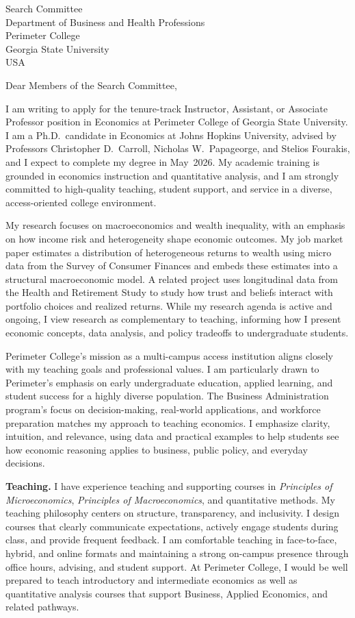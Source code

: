 \documentclass[11pt,letterpaper]{letter}
\begin{document}
\begin{letter}{Search Committee \\
Department of Business and Health Professions \\
Perimeter College \\
Georgia State University \\ USA}

\opening{Dear Members of the Search Committee,}

I am writing to apply for the tenure-track Instructor, Assistant, or Associate Professor position in Economics at Perimeter College of Georgia State University. I am a Ph.D.\ candidate in Economics at Johns Hopkins University, advised by Professors Christopher D.~Carroll, Nicholas W.~Papageorge, and Stelios Fourakis, and I expect to complete my degree in May~2026. My academic training is grounded in economics instruction and quantitative analysis, and I am strongly committed to high-quality teaching, student support, and service in a diverse, access-oriented college environment.

My research focuses on macroeconomics and wealth inequality, with an emphasis on how income risk and heterogeneity shape economic outcomes. My job market paper estimates a distribution of heterogeneous returns to wealth using micro data from the Survey of Consumer Finances and embeds these estimates into a structural macroeconomic model. A related project uses longitudinal data from the Health and Retirement Study to study how trust and beliefs interact with portfolio choices and realized returns. While my research agenda is active and ongoing, I view research as complementary to teaching, informing how I present economic concepts, data analysis, and policy tradeoffs to undergraduate students.

Perimeter College’s mission as a multi-campus access institution aligns closely with my teaching goals and professional values. I am particularly drawn to Perimeter’s emphasis on early undergraduate education, applied learning, and student success for a highly diverse population. The Business Administration program’s focus on decision-making, real-world applications, and workforce preparation matches my approach to teaching economics. I emphasize clarity, intuition, and relevance, using data and practical examples to help students see how economic reasoning applies to business, public policy, and everyday decisions.

\textbf{Teaching.} I have experience teaching and supporting courses in \textit{Principles of Microeconomics}, \textit{Principles of Macroeconomics}, and quantitative methods. My teaching philosophy centers on structure, transparency, and inclusivity. I design courses that clearly communicate expectations, actively engage students during class, and provide frequent feedback. I am comfortable teaching in face-to-face, hybrid, and online formats and maintaining a strong on-campus presence through office hours, advising, and student support. At Perimeter College, I would be well prepared to teach introductory and intermediate economics as well as quantitative analysis courses that support Business, Applied Economics, and related pathways.


\end{letter}
\end{document}
